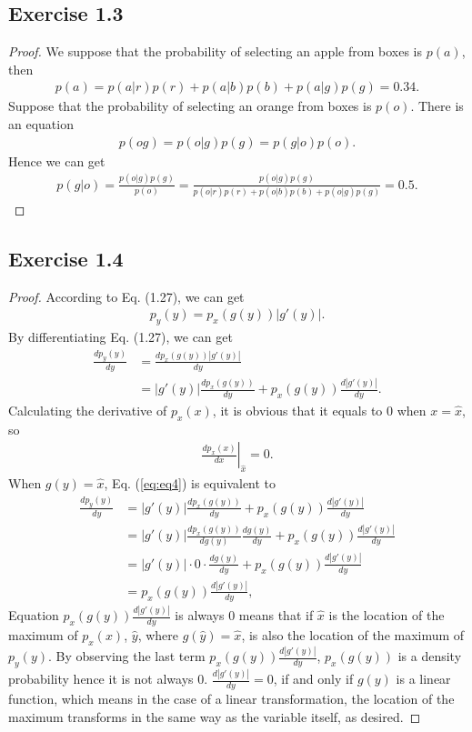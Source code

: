 \documentclass[11pt]{article}
\theoremstyle{definition}
\begin{document}
\subsection{Exercise 1.3}
\begin{proof}
We suppose that the probability of selecting an apple from boxes is $p(a)$, then
\begin{align*}
p(a) = p(a|r)p(r) + p(a|b)p(b) + p(a|g)p(g) = 0.34.
\end{align*}
Suppose that the probability of selecting an orange from boxes is $p(o)$. There is an equation
\begin{align*}
p(og) = p(o|g)p(g) = p(g|o)p(o).
\end{align*}
Hence we can get
\begin{align*}
p(g|o) = \frac{p(o|g)p(g)}{p(o)} = \frac{p(o|g)p(g)}{p(o|r)p(r) + p(o|b)p(b) + p(o|g)p(g)} = 0.5.
\end{align*}
\end{proof}

\subsection{Exercise 1.4}
\begin{proof}
According to Eq. (1.27), we can get
\begin{align*}
p_y(y) = p_x(g(y))|g'(y)|.
\end{align*}
By differentiating Eq. (1.27), we can get
\begin{align}
\frac{dp_y(y)}{dy} &= \frac{dp_x(g(y))|g'(y)|}{dy} \nonumber\\
&= |g'(y)|\frac{dp_x(g(y))}{dy} + 
 p_x(g(y))\frac{d|g'(y)|}{dy}. \label{eq:eq4}
\end{align}
Calculating the derivative of $p_x(x)$, it is obvious that it equals to 0 when $x=\hat{x}$, so
\begin{align*}
{\left.{\frac{dp_x(x)}{dx}}\right|}_{\hat{x}} = 0.
\end{align*}
When $g(y) = \hat{x}$, Eq. (\ref{eq:eq4}) is equivalent to
\begin{align}
\frac{dp_y(y)}{dy}  &= |g'(y)|\frac{dp_x(g(y))}{dy} + 
 p_x(g(y))\frac{d|g'(y)|}{dy} \nonumber\\
 &= |g'(y)|\frac{dp_x(g(y))}{dg(y)}\frac{dg(y)}{dy} + 
 p_x(g(y))\frac{d|g'(y)|}{dy}\nonumber\\
 &= |g'(y)|\cdot 0 \cdot\frac{dg(y)}{dy} + 
 p_x(g(y))\frac{d|g'(y)|}{dy}\nonumber\\
 &= p_x(g(y))\frac{d|g'(y)|}{dy},\nonumber
\end{align}
 Equation $p_x(g(y))\frac{d|g'(y)|}{dy}$ is always 0 means that if $\hat{x}$ is the location of the maximum of $p_x(x)$, $\hat{y}$, where $g(\hat{y}) = \hat{x}$, is also the location of the maximum of $p_y(y)$. By observing the last term $p_x(g(y))\frac{d|g'(y)|}{dy}$, $p_x(g(y))$ is a density probability hence it is not always 0. $\frac{d|g'(y)|}{dy} = 0$, if and only if $g(y)$ is a linear function, which means in the case of a linear transformation, the location of the maximum transforms in the same way as the variable itself, as desired.
\end{proof}
\end{document}
